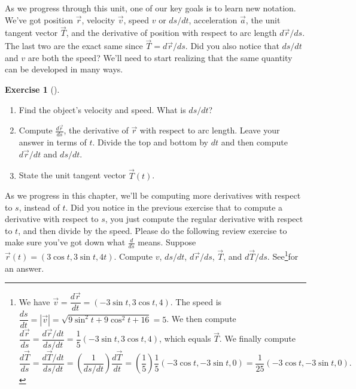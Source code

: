 \documentclass[10pt,]{book}
\theoremstyle{plain}
\theoremstyle{definition}
\theoremstyle{definition}
\theoremstyle{definition}
\theoremstyle{definition}
\newtheorem{exploration}[project]{Exercise}
\theoremstyle{definition}
\numberwithin{equation}{section}
\begin{document}
As we progress through this unit, one of our key goals is to learn new notation. We've got position \(\vec r\), velocity \(\vec v\), speed \(v\) or \(ds/dt\), acceleration \(\vec a\), the unit tangent vector \(\vec T\), and the derivative of position with respect to arc length \(d\vec r/ds\). The last two are the exact same since \(\vec T = d\vec r/ds\). Did you also notice that \(ds/dt\) and \(v\) are both the speed? We'll need to start realizing that the same quantity can be developed in many ways.%
\begin{exploration}[]\label{exploration-168}
\leavevmode%
\begin{enumerate}[font=\bfseries,label=(\alph*),ref=\alph*]
\item\label{task-398} Find the object's velocity and speed. What is \(ds/dt\)?%
\item\label{task-399} Compute \(\frac{d\vec r}{ds}\), the derivative of \(\vec r\) with respect to arc length. Leave your answer in terms of \(t\). Divide the top and bottom by \(dt\) and then compute \(d\vec r/dt\) and \(ds/dt\).%
%
\item\label{task-400} State the unit tangent vector \(\vec T(t)\).%
\end{enumerate}
\end{exploration}
As we progress in this chapter, we'll be computing more derivatives with respect to \(s\), instead of \(t\). Did you notice in the previous exercise that to compute a derivative with respect to \(s\), you just compute the regular derivative with respect to \(t\), and then divide by the speed. Please do the following review exercise to make sure you've got down what \(\frac{d}{ds}\) means.%
Suppose \(\vec r(t)=(3\cos t,3\sin t,4t)\). Compute \(v\), \(ds/dt\), \(d\vec r/ds\), \(\vec T\), and \(d\vec T/ds\). See\footnote{We have \(\vec v = \dfrac{d\vec r}{dt} = (-3\sin t, 3\cos t, 4)\). The speed is \(\dfrac{ds}{dt}=|\vec v| = \sqrt{9\sin^2t+9\cos^2t+16}=5\). We then compute \(\dfrac{d\vec r}{ds}=\dfrac{d\vec r/dt}{ds/dt} = \dfrac{1}{5}(-3\sin t, 3\cos t, 4)\), which equals \(\vec T\). We finally compute%
\begin{equation*}
\dfrac{d\vec T}{ds}=\dfrac{d\vec T/dt}{ds/dt}=\left(\dfrac{1}{ds/dt}\right)\dfrac{d\vec T}{dt} = \left(\dfrac{1}{5}\right)\dfrac{1}{5}(-3\cos t, -3\sin t, 0) =  \dfrac{1}{25}(-3\cos t, -3\sin t, 0).
\end{equation*}
\label{fn-10}}for an answer.%
\typeout{************************************************}
\typeout{************************************************}
\end{document}
